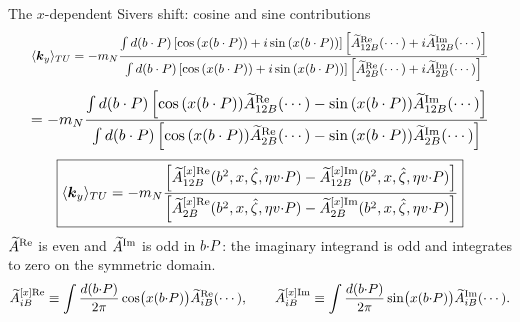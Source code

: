\begin{frame}{The $x$-dependent Sivers shift: cosine and sine contributions}
  \centering
  \small
  \[\resizebox{0.95\textwidth}{!}{$\displaystyle \langle\vect{k}_y\rangle_{TU}=-m_{N} \frac{\int d(b\cdot P)\left[\cos{\left(x(b\cdot P)\right)}+i\sin{\left(x(b\cdot P)\right)}\right] \left[\tAmp_{12B}^{\text{Re}}(\cdots)+i\tAmp_{12B}^{\text{Im}}(\cdots)\right]}{\int d(b\cdot P)\left[\cos{\left(x(b\cdot P)\right)}+i\sin{\left(x(b\cdot P)\right)}\right]\left[\tAmp_{2B}^{\text{Re}}(\cdots)+i\tAmp_{2B}^{\text{Im}}(\cdots)\right]}$}\]
  \[\resizebox{0.95\textwidth}{!}{$\displaystyle =-m_{N} \frac{\int d(b\cdot P) \left[\cos{\left(x(b\cdot P)\right)}\tAmp_{12B}^{\text{Re}}(\cdots)-\sin{\left(x(b\cdot P)\right)}\tAmp_{12B}^{\text{Im}}(\cdots)\right]}{\int d(b\cdot P)\left[\cos{\left(x(b\cdot P)\right)}\tAmp_{2B}^{\text{Re}}(\cdots)-\sin{\left(x(b\cdot P)\right)}\tAmp_{2B}^{\text{Im}}(\cdots)\right]} $}\]
  \[\resizebox{0.84\textwidth}{!}{$\displaystyle \boxed{\langle\vect{k}_y\rangle_{TU}=-m_{N} \frac{\left[\tAmp_{12B}^{[x]\text{Re}}(b^2,x,\zetahat,\eta v \tcdot P)-\tAmp_{12B}^{[x]\text{Im}}(b^2,x,\zetahat,\eta v \tcdot P)\right]}{\left[\tAmp_{2B}^{[x]\text{Re}}(b^2,x,\zetahat,\eta v \tcdot P)-\tAmp_{2B}^{[x]\text{Im}}(b^2,x,\zetahat,\eta v \tcdot P)\right]}}$}\]
  \footnotesize
  $\widetilde{A}^{\text{Re}}$ is even and $\widetilde{A}^{\text{Im}}$ is odd in $b{\cdot} P$:
  the imaginary integrand is odd and integrates to zero on the symmetric domain.
  \[
    \widetilde{A}_{iB}^{[x]\text{Re}}\equiv\int\frac{d(b{\cdot} P)}{2\pi}\cos\!\big(x(b{\cdot} P)\big)\widetilde{A}_{iB}^{\text{Re}}(\cdots),\qquad
    \widetilde{A}_{iB}^{[x]\text{Im}}\equiv\int\frac{d(b{\cdot} P)}{2\pi}\sin\!\big(x(b{\cdot} P)\big)\widetilde{A}_{iB}^{\text{Im}}(\cdots).
  \]
\end{frame}

